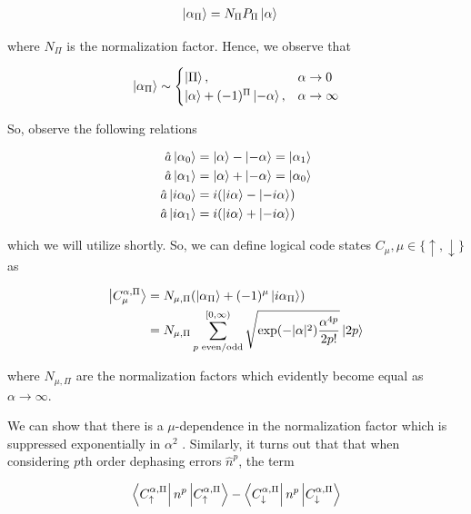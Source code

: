 \documentclass[12]{amsart}
\newcommand\0{\mathbf{0}}
\newcommand\<{\langle}
\renewcommand\>{\rangle}
\begin{document}
\begin{align*}
\ket{\alpha_\Pi} &= N_\Pi P_\Pi \ket{\alpha}
\end{align*}

where $N_\Pi$ is the normalization factor. Hence, we observe that

\begin{align*}
\ket{\alpha_\Pi} \sim \begin{cases} \ket{\Pi},  &\alpha \rightarrow 0\\ \ket{\alpha} + (-1)^\Pi \ket{-\alpha}, &\alpha \rightarrow \infty \end{cases}
\end{align*}

So, observe the following relations

\begin{align}
\label{eq:cat-rels}
\begin{split}
\hat{a} \ket{\alpha_0} &= \ket{\alpha} - \ket{-\alpha} = \ket{\alpha_1} \\
\hat{a} \ket{\alpha_1} &= \ket{\alpha} + \ket{-\alpha} = \ket{\alpha_0} \\
\hat{a} \ket{i\alpha_0} &= i(\ket{i\alpha} - \ket{-i\alpha})\\
\hat{a} \ket{i\alpha_1} &= i(\ket{i\alpha}  + \ket{-i\alpha})
\end{split}
\end{align}

which we will utilize shortly. So, we can define logical code states $C_\mu, \mu \in \{ \uparrow, \downarrow \}$ as 

\begin{align*}
\ket{C_\mu^{\alpha, \Pi}} &= N_{\mu, \Pi} (\ket{\alpha_\Pi} + (-1)^\mu \ket{i \alpha_\Pi})\\
&= N_{\mu, \Pi} \sum_{p\text{ even/odd}}^{[0, \infty)}\sqrt{\exp(-|\alpha|^2)\frac{
\alpha^{4p}}{2p!}}\ket{2p}
\end{align*}

where $N_{\mu, \Pi}$ are the normalization factors which evidently become equal as $\alpha \rightarrow \infty$. 


We can show that there is a $\mu$-dependence in the normalization factor which is suppressed exponentially in $\alpha^2$ \cite{albert2018multimode}. Similarly, it turns out that that when considering $p$th order dephasing errors $\hat{n}^p$, the term

$$
\bra{C^{\alpha, \Pi}_{\uparrow}} n^p \ket{C^{\alpha, \Pi}_{\uparrow}} - \bra{C^{\alpha, \Pi}_{\downarrow}} n^p \ket{C^{\alpha, \Pi}_{\downarrow}}
$$ 
\end{document}
